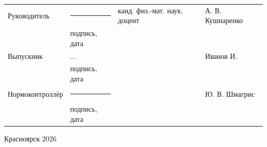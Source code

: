 \begin{titlepage}
\noindent
\begin{tabular}{@{} p{} >{\centering\arraybackslash} p{} p{} p{} @{}}
	Руководитель     & \rule{3.5cm}{.1pt}          & канд. физ.-мат. наук, доцент & А. В. Кушнаренко \\[-1ex]
	& {\scriptsize подпись, дата} &                   &                  \\[2ex]
	Выпускник & ... & & Иванов И. \\[-1ex]
	& {\scriptsize подпись, дата} &                   &                  \\[2ex]
	Нормоконтроллёр  & \rule{3.5cm}{.1pt}          &                   & Ю. В. Шмагрис \\[-1ex]
	& {\scriptsize подпись, дата} &                   &                  \\
\end{tabular}

\vfill
\begin{center}Красноярск 2026\end{center}
\end{titlepage}
\restoregeometry